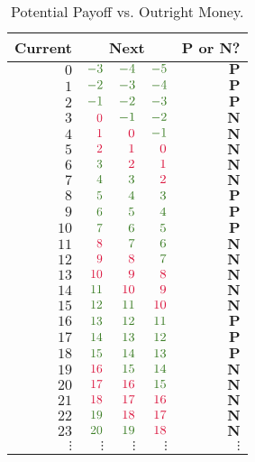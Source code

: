 \documentclass[11pt, reqno]{amsart}
\begin{document}
\begin{problem}[5]
  \begin{table}[h!]
    \centering
    \begin{tabular}{||r|r|r|r|r||}
    \bottomrule
      Current & \multicolumn{3}{|c|}{Next} & P or N? \\
    \midrule
      $0$ & $\green{-3}$ & $\green{-4}$ & $\green{-5}$ & $\mathbf{P}$ \\
      $1$ & $\green{-2}$ & $\green{-3}$ & $\green{-4}$ & $\mathbf{P}$ \\
      $2$ & $\green{-1}$ & $\green{-2}$ & $\green{-3}$ & $\mathbf{P}$ \\
      \midrule
      $3$ & $\crim{0}$ & $\green{-1}$ & $\green{-2}$ & $\mathbf{N}$ \\
      $4$ & $\crim{1}$ & $\crim{0}$ & $\green{-1}$ & $\mathbf{N}$ \\
      $5$ & $\crim{2}$ & $\crim{1}$ & $\crim{0}$ & $\mathbf{N}$ \\
      $6$ & $\green{3}$ & $\crim{2}$ & $\crim{1}$ & $\mathbf{N}$ \\
      $7$ & $\green{4}$ & $\green{3}$ & $\crim{2}$ & $\mathbf{N}$ \\
      \midrule
      $8$ & $\green{5}$ & $\green{4}$ & $\green{3}$ & $\mathbf{P}$ \\
      $9$ & $\green{6}$ & $\green{5}$ & $\green{4}$ & $\mathbf{P}$ \\
      $10$ & $\green{7}$ & $\green{6}$ & $\green{5}$ & $\mathbf{P}$ \\
      \midrule
      $11$ & $\crim{8}$ & $\green{7}$ & $\green{6}$ & $\mathbf{N}$ \\
      $12$ & $\crim{9}$ & $\crim{8}$ & $\green{7}$ & $\mathbf{N}$ \\
      $13$ & $\crim{10}$ & $\crim{9}$ & $\crim{8}$ & $\mathbf{N}$ \\
      $14$ & $\green{11}$ & $\crim{10}$ & $\crim{9}$ & $\mathbf{N}$ \\
      $15$ & $\green{12}$ & $\green{11}$ & $\crim{10}$ & $\mathbf{N}$ \\
      \midrule
      $16$ & $\green{13}$ & $\green{12}$ & $\green{11}$ & $\mathbf{P}$ \\
      $17$ & $\green{14}$ & $\green{13}$ & $\green{12}$ & $\mathbf{P}$ \\
      $18$ & $\green{15}$ & $\green{14}$ & $\green{13}$ & $\mathbf{P}$ \\
      \midrule
      $19$ & $\crim{16}$ & $\green{15}$ & $\green{14}$ & $\mathbf{N}$ \\
      $20$ & $\crim{17}$ & $\crim{16}$ & $\green{15}$ & $\mathbf{N}$ \\
      $21$ & $\crim{18}$ & $\crim{17}$ & $\crim{16}$ & $\mathbf{N}$ \\
      $22$ & $\green{19}$ & $\crim{18}$ & $\crim{17}$ & $\mathbf{N}$ \\
      $23$ & $\green{20}$ & $\green{19}$ & $\crim{18}$ & $\mathbf{N}$ \\
      \midrule
      $\vdots$ & $\vdots$ & $\vdots$ & $\vdots$ & $\vdots$ \\
    \end{tabular}
    \caption{Potential Payoff vs. Outright Money.}
  \end{table}
\end{problem}
\end{document}
